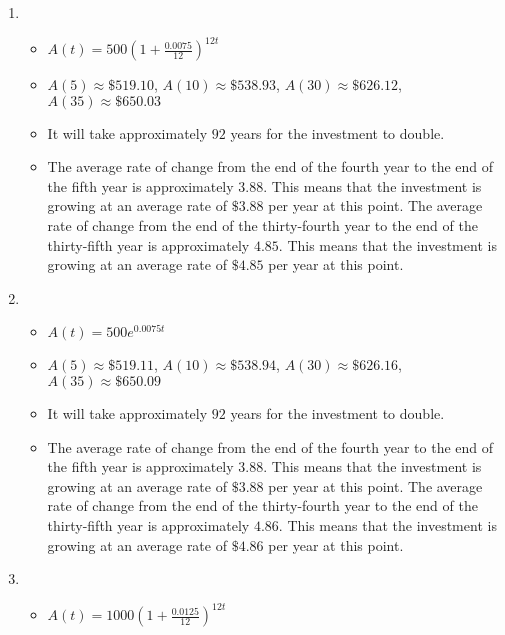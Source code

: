 \documentclass{ximera}
\begin{document}
\begin{enumerate}

\item \begin{itemize}  \item $A(t) = 500\left(1 + \frac{0.0075}{12}\right)^{12t}$ 

\item $A(5) \approx \$ 519.10$, $A(10) \approx \$ 538.93$, $A(30) \approx \$ 626.12$, $A(35) \approx \$ 650.03$ 

\item It will take approximately $92$ years for the investment to double.

\item  The average rate of change from the end of the fourth year to the end of the fifth year is approximately $3.88$.  This means that the investment is growing at an average rate of $\$3.88$ per year at this point.  The average rate of change from the end of the thirty-fourth year to the end of the thirty-fifth year is approximately $4.85$.  This means that the investment is growing at an average rate of $\$4.85$ per year at this point. 

\end{itemize}

\item \begin{itemize}  \item $A(t) = 500e^{0.0075t}$ 

\item $A(5) \approx \$ 519.11$, $A(10) \approx \$ 538.94$, $A(30) \approx \$ 626.16$, $A(35) \approx \$ 650.09$ 

\item It will take approximately $92$ years for the investment to double.

\item  The average rate of change from the end of the fourth year to the end of the fifth year is approximately $3.88$.  This means that the investment is growing at an average rate of $\$3.88$ per year at this point.  The average rate of change from the end of the thirty-fourth year to the end of the thirty-fifth year is approximately $4.86$.  This means that the investment is growing at an average rate of $\$4.86$ per year at this point. 

\end{itemize}

\item \begin{itemize}  \item $A(t) = 1000\left(1 + \frac{0.0125}{12}\right)^{12t}$ 


\end{itemize}
\end{enumerate}
\end{document}
